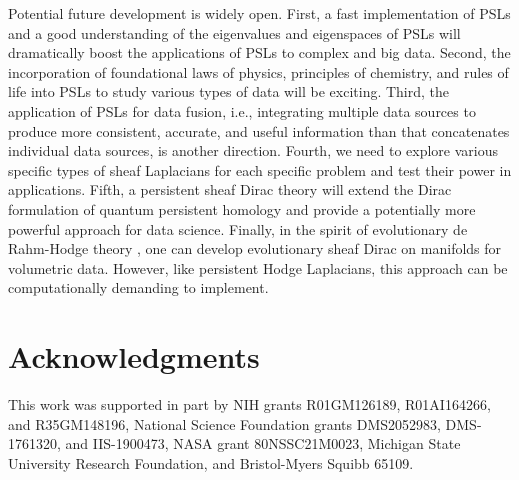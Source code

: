 \documentclass[11pt]{article}
\theoremstyle{definition}
\theoremstyle{definition}
\begin{document}
Potential future development is widely open. 
First, a fast implementation of PSLs and a good understanding of the eigenvalues and eigenspaces of PSLs will dramatically boost the applications of PSLs to complex and big data.
Second, the incorporation of foundational laws of physics, principles of chemistry, and rules of life into PSLs to study various types of data will be exciting. 
Third, the application of PSLs for data fusion, i.e., integrating multiple data sources to produce more consistent, accurate, and useful information than that concatenates individual data sources, is another direction. 
Fourth, we need to explore various specific types of sheaf Laplacians for each specific problem and test their power in applications. 
Fifth, a persistent sheaf Dirac theory will extend the Dirac formulation of quantum persistent homology \cite{ameneyro2022quantum} and provide a potentially more powerful approach for data science.  
Finally, in the spirit of evolutionary de Rahm-Hodge theory \cite{chen2019evolutionary}, one can develop  evolutionary sheaf Dirac on manifolds for volumetric data. 
However, like persistent Hodge Laplacians, this approach can be computationally demanding to implement. 


\section*{Acknowledgments}
This work was supported in part by NIH grants R01GM126189, R01AI164266, and R35GM148196, National Science Foundation grants DMS2052983, DMS-1761320, and IIS-1900473, NASA  grant 80NSSC21M0023,   Michigan State University Research Foundation, and  Bristol-Myers Squibb  65109.  

\clearpage 

%

\end{document}
